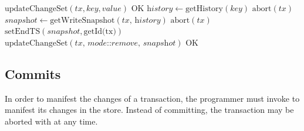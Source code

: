 \begin{algorithm}
\begin{algorithmic}[1]
\State $\text{updateChangeSet}(tx, key, value)$
\State \Return $\text{OK}$
\EndIf
\State $\textit{history} \gets \text{getHistory}(\textit{key})$
\State \Return $\text{abort}(tx)$
\EndIf
\State $\textit{snapshot} \gets \text{getWriteSnapshot}(\textit{tx, history})$
\State \Return $\text{abort}(tx)$
\EndIf
\State $\text{setEndTS}(snapshot, \text{getId(tx)})$
\State $\text{updateChangeSet}(\textit{tx, mode::remove, snapshot})$
\State \Return $\text{OK}$
\EndProcedure
\end{algorithmic}
\caption{}
\label{alg:delete}
\end{algorithm}

\subsection{Commits}

In order to manifest the changes of a transaction, the programmer must invoke  to manifest its changes in the store. Instead of committing, the transaction may be aborted with  at any time.

